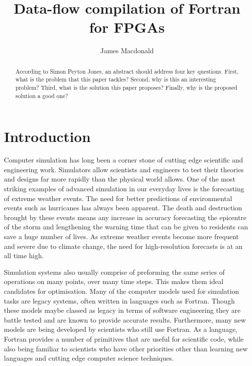 \documentclass{mpaper}
\begin{document}
\title{Data-flow compilation of Fortran for FPGAs}
\author{James Macdonald}

\maketitle

\begin{abstract}
According to Simon Peyton Jones, an abstract should address
four key questions. First, what is the problem that this
paper tackles? Second, why is this an interesting problem?
Third, what is the solution this paper proposes?
Finally, why is the proposed solution a good one?
\end{abstract}

\section{Introduction}

Computer simulation has long been a corner stone of cutting edge scientific and engineering work. Simulators allow scientists and engineers to test their theories and designs far more rapidly than the physical world allows. One of the most striking examples of advanced simulation in our everyday lives is the forecasting of extreme weather events. The need for better predictions of environmental events such as hurricanes has always been apparent. The death and destruction brought by these events means any increase in accuracy forecasting the epicentre of the storm and lengthening the warning time that can be given to residents can save a huge number of lives. As extreme weather events become more frequent and severe due to climate change, the need for high-resolution forecasts is at an all time high.

Simulation systems also usually comprise of preforming the same series of operations on many points, over many time steps. This makes them ideal candidates for optimisation. Many of the computer models used for simulation tasks are legacy systems, often written in languages such as Fortran. Though these models maybe classed as legacy in terms of software engineering they are battle tested and are known to provide accurate results. Furthermore, many new models are being developed by scientists who still use Fortran. As a language, Fortran provides a number of primitives that are useful for scientific code, while also being familiar to scientists who have other priorities other than learning new languages and cutting edge computer science techniques.
\end{document}
